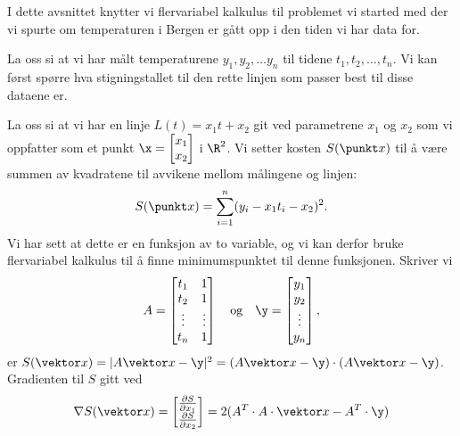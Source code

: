I dette avsnittet knytter vi flervariabel kalkulus til problemet vi started med der vi spurte om 
temperaturen i Bergen er gått opp i den tiden vi har data for.

La oss si at vi har målt temperaturene $y_1, y_2, \dots y_n$ til tidene $t_1, t_2, \dots, t_n$.
Vi kan først spørre hva stigningstallet til den rette linjen som passer best til disse dataene er.

La oss si at vi har en linje $L(t) = x_1t + x_2$ git ved parametrene $x_1$ og $x_2$ som vi oppfatter
som et punkt $\x = \begin{bmatrix}x_1\\x_2\end{bmatrix}$ i $\R^2$. Vi setter kosten $S(\punkt x)$
til å være summen av kvadratene til avvikene mellom
målingene og linjen:
$$S(\punkt x) = \sum_{i=1}^n (y_i - x_1t_i - x_2)^2.$$
Vi har sett at dette er en funksjon av to variable, og vi kan derfor bruke
flervariabel kalkulus til å finne minimumspunktet til denne funksjonen.
Skriver vi
$$A = \begin{bmatrix}t_1 & 1 \\ t_2 & 1 \\ \vdots & \vdots \\ t_n & 1\end{bmatrix} \quad \text{og} \quad
\y = \begin{bmatrix}y_1 \\ y_2 \\ \vdots \\ y_n\end{bmatrix},$$
er $S(\vektor x) = |A\vektor x - \y|^2 = (A\vektor x - \y) \cdot (A\vektor x - \y)$.
Gradienten til $S$ gitt ved
$$\nabla S(\vektor x) =  \begin{bmatrix} \frac{\partial S}{\partial x_1} \\
\frac{\partial S}{\partial x_2} \end{bmatrix}
= 2(A^T \cdot A \cdot \vektor x - A^T \cdot \y)$$

